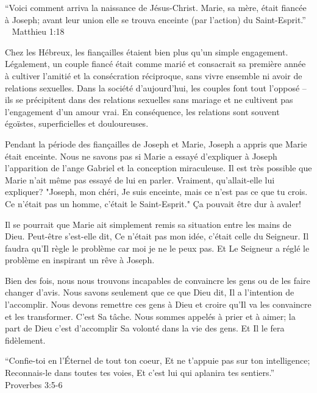 

“Voici comment arriva la naissance de Jésus-Christ. Marie, sa mère, était fiancée à Joseph; avant leur union elle se trouva enceinte (par l’action) du Saint-Esprit.”  ~ Matthieu 1:18

Chez les Hébreux, les fiançailles étaient bien plus qu'un simple engagement. Légalement, un couple fiancé était comme marié et consacrait sa première année à cultiver l'amitié et la consécration réciproque, sans vivre ensemble ni avoir de relations sexuelles. Dans la société d'aujourd'hui, les couples font tout l'opposé – ils se précipitent dans des relations sexuelles sans mariage et ne cultivent pas l'engagement d'un amour vrai. En conséquence, les relations sont souvent égoïstes, superficielles et douloureuses.

Pendant la période des fiançailles de Joseph et Marie, Joseph a appris que Marie était enceinte. Nous ne savons pas si Marie a essayé d'expliquer à Joseph l'apparition de l'ange Gabriel et la conception miraculeuse. Il est très possible que Marie n'ait même pas essayé de lui en parler. Vraiment, qu'allait-elle lui expliquer? "Joseph, mon chéri, Je suis enceinte, mais ce n'est pas ce que tu crois. Ce n'était pas un homme, c'était le Saint-Esprit." Ça pouvait être dur à avaler!

Il se pourrait que Marie ait simplement remis sa situation entre les mains de Dieu. Peut-être s'est-elle dit, Ce n'était pas mon idée, c'était celle du Seigneur. Il faudra qu'Il règle le problème car moi je ne le peux pas. Et Le Seigneur a réglé le problème en inspirant un rêve à Joseph.

Bien des fois, nous nous trouvons incapables de convaincre les gens ou de les faire changer d'avis. Nous savons seulement que ce que Dieu dit, Il a l'intention de l'accomplir. Nous devons remettre ces gens à Dieu et croire qu'Il va les convaincre et les transformer. C'est Sa tâche. Nous sommes appelés à prier et à aimer; la part de Dieu c'est d'accomplir Sa volonté dans la vie des gens. Et Il le fera fidèlement.


“Confie-toi en l’Éternel de tout ton coeur, Et ne t’appuie pas sur ton intelligence; Reconnais-le dans toutes tes voies, Et c’est lui qui aplanira tes sentiers.” ~ Proverbes 3:5-6 


                      

